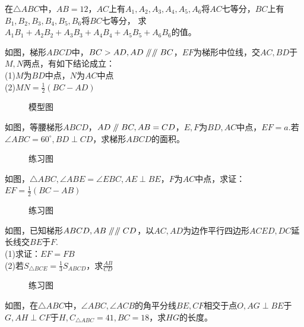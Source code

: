 \begin{problem}
在$\triangle ABC$中，$AB=12$，$AC$上有$A_1,A_2,A_3,A_4,A_5,A_6$将$AC$七等分，$BC$上有$B_1,B_2,B_3,B_4,B_5,B_6$将$BC$七等分，
求$A_1B_1+A_2B_2+A_3B_3+A_4B_4+A_5B_5+A_6B_6$的值。
\end{problem}
\begin{definition}
    如图，梯形$ABCD$中，$BC>AD,AD\mathrel{/\mkern-5mu/} \mathrel{/\mkern-5mu/} BC$，$EF$为梯形中位线，交$AC,BD$于$M,N$两点，有如下结论成立：\\
    (1)$M$为$BD$中点，$N$为$AC$中点 \\
    (2)$MN=\frac{1}{2}(BC-AD)$
\end{definition}
\begin{figure}[H]
    \centering
    \resizebox{4cm}{!}{}
    \caption{模型图}
\end{figure}
\begin{problem}
如图，等腰梯形$ABCD$，$AD\mathrel{/\mkern-5mu/} BC,AB=CD$，$E,F$为$BD,AC$中点，$EF=a$.若$\angle ABC=60^\circ,BD\perp CD$，求梯形$ABCD$的面积。
\end{problem}
\begin{figure}[H]
    \centering
    \resizebox{4cm}{!}{}
    \caption{练习图}
\end{figure}
\begin{problem}
如图，$\triangle ABC,\angle ABE=\angle EBC,AE\perp BE$，$F$为$AC$中点，求证：$EF=\frac{1}{2}(BC-AB)$
\end{problem}
\begin{figure}[H]
    \centering
    \resizebox{4cm}{!}{}
    \caption{练习图}
\end{figure}
\begin{problem}
如图，已知梯形$ABCD,AB\mathrel{/\mkern-5mu/}\mathrel{/\mkern-5mu/} CD$，以$AC,AD$为边作平行四边形$ACED,DC$延长线交$BE$于$F$. \\
(1)求证：$EF=FB$ \\
(2)若$S_{\triangle BCE}=\frac{1}{3}S_{ABCD}$，求$\frac{AB}{CD}$
\end{problem}
\begin{figure}[H]
    \centering
    \resizebox{4cm}{!}{}
    \caption{练习图}
\end{figure}
\begin{problem}
如图，在$\triangle ABC$中，$\angle ABC,\angle ACB$的角平分线$BE,CF$相交于点$O,AG\perp BE$于$G,AH\perp CF$于$H,C_{\triangle ABC}=41,BC=18$，求$HG$的长度。
\end{problem}
